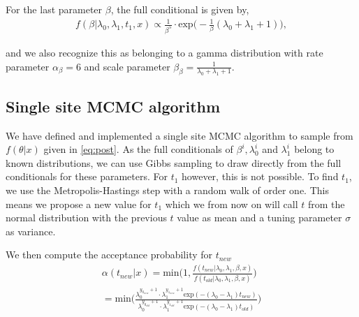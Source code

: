 For the last parameter $\beta$, the full conditional is given by,
\begin{align}
    f(\beta | \lambda_0, \lambda_1, t_1, x) \propto 
    \frac{1}{\beta^5} \cdot \text{exp} \Big( -\frac{1}{\beta}(\lambda_0 + \lambda_1 + 1) \Big),
\end{align}

and we also recognize this as belonging to a gamma distribution with rate parameter $\alpha_{\beta} = 6$ and scale parameter $\beta_{\beta} = \frac{1}{\lambda_0 + \lambda_1 + 1} $. 

\subsection{Single site MCMC algorithm}

We have defined and implemented a single site MCMC algorithm to sample from $f(\theta |x)$ given in \ref{eq:post}. As the full conditionals of $\beta^i, \lambda_0^i$ and $\lambda_1^i$ belong to known distributions, we can use Gibbs sampling to draw directly from the full conditionals for these parameters. For $t_1$ however, this is not possible.
To find $t_1$, we use the Metropolis-Hastings step with a random walk of order one. This means we propose a new value for $t_1$ which we from now on will call $t$ from the normal distribution with the previous $t$ value as mean and a tuning parameter $\sigma$ as variance. 


We then compute the acceptance probability for $t_{new}$
\begin{align}
    \alpha(t_{new}|x) = \text{min} \Big( 1, \frac{f(t_{new}| \lambda_0, \lambda_1, \beta, x)}{f(t_{old}| \lambda_0, \lambda_1, \beta, x)} \Big) \nonumber \\ 
    = \text{min} \Big( \frac{\lambda_0^{y_{0_{new}} + 1} \cdot \lambda_1^{y_{1_{new}} + 1} \text{exp}(-(\lambda_0 - \lambda_1)t_{new})}{\lambda_0^{y_{0_{old}} + 1} \cdot \lambda_1^{y_{1_{old}} + 1} \text{exp}(-(\lambda_0 - \lambda_1)t_{old})} \Big) \nonumber 
\end{align}

